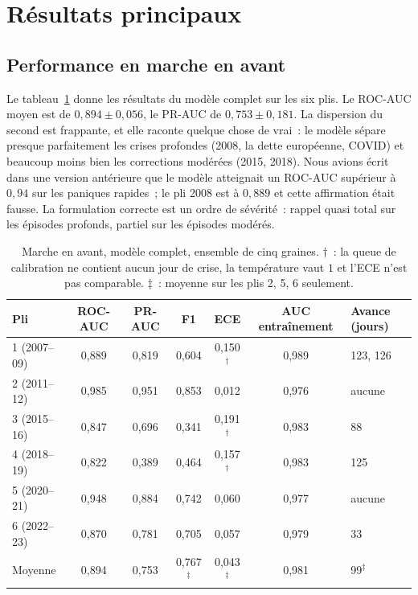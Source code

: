 \documentclass[11pt,a4paper]{article}
\begin{document}
\section{Résultats principaux}
\label{sec:results}

\subsection{Performance en marche en avant}

Le tableau~\ref{tab:main} donne les résultats du modèle complet sur les six plis. Le ROC-AUC moyen est de $0{,}894\pm0{,}056$, le PR-AUC de $0{,}753\pm0{,}181$. La dispersion du second est frappante, et elle raconte quelque chose de vrai~: le modèle sépare presque parfaitement les crises profondes (2008, la dette européenne, COVID) et beaucoup moins bien les corrections modérées (2015, 2018). Nous avions écrit dans une version antérieure que le modèle atteignait un ROC-AUC supérieur à $0{,}94$ sur les paniques rapides~; le pli 2008 est à $0{,}889$ et cette affirmation était fausse. La formulation correcte est un ordre de sévérité~: rappel quasi total sur les épisodes profonds, partiel sur les épisodes modérés.

\begin{table}[htbp]
\centering\small
\caption{Marche en avant, modèle complet, ensemble de cinq graines. $\dagger$~: la queue de calibration ne contient aucun jour de crise, la température vaut $1$ et l'ECE n'est pas comparable. $\ddagger$~: moyenne sur les plis 2, 5, 6 seulement.}
\label{tab:main}
\begin{tabular}{lcccccl}
\toprule
Pli & ROC-AUC & PR-AUC & F1 & ECE & AUC entraînement & Avance (jours) \\
\midrule
1 (2007--09) & 0,889 & 0,819 & 0,604 & 0,150$^\dagger$ & 0,989 & 123, 126 \\
2 (2011--12) & 0,985 & 0,951 & 0,853 & 0,012 & 0,976 & aucune \\
3 (2015--16) & 0,847 & 0,696 & 0,341 & 0,191$^\dagger$ & 0,983 & 88 \\
4 (2018--19) & 0,822 & 0,389 & 0,464 & 0,157$^\dagger$ & 0,983 & 125 \\
5 (2020--21) & 0,948 & 0,884 & 0,742 & 0,060 & 0,977 & aucune \\
6 (2022--23) & 0,870 & 0,781 & 0,705 & 0,057 & 0,979 & 33 \\
\midrule
Moyenne & 0,894 & 0,753 & 0,767$^\ddagger$ & 0,043$^\ddagger$ & 0,981 & 99$^\ddagger$ \\
\bottomrule
\end{tabular}
\end{table}
\end{document}
